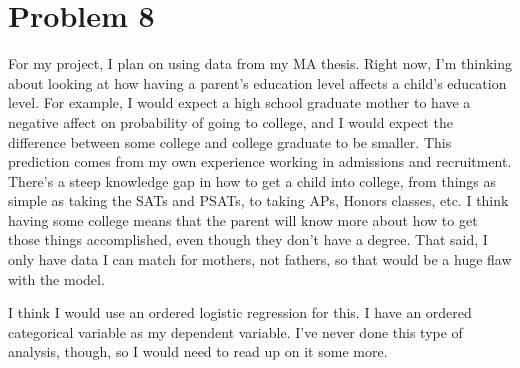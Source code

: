 \documentclass{article}
\begin{document}
\section{Problem 8}
For my project, I plan on using data from my MA thesis. Right now, I'm thinking about looking at how having a parent's education level affects a child's education level. For example, I would expect a high school graduate mother to have a negative affect on probability of going to college, and I would expect the difference between some college and college graduate to be smaller. This prediction comes from my own experience working in admissions and recruitment. There's a steep knowledge gap in how to get a child into college, from things as simple as taking the SATs and PSATs, to taking APs, Honors classes, etc. I think having some college means that the parent will know more about how to get those things accomplished, even though they don't have a degree. That said, I only have data I can match for mothers, not fathers, so that would be a huge flaw with the model.

I think I would use an ordered logistic regression for this. I have an ordered categorical variable as my dependent variable. I've never done this type of analysis, though, so I would need to read up on it some more.
\end{document}
